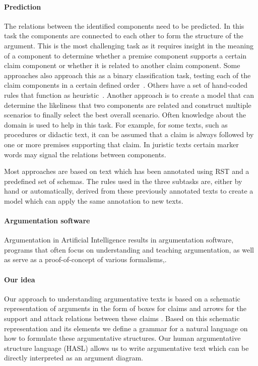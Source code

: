 \documentclass{IOS-Book-Article}
\begin{document}
\paragraph{Prediction} The relations between the identified components need to be predicted. In this task the components are connected to each other to form the structure of the argument. This is the most challenging task as it requires insight in the meaning of a component to determine whether a premise component supports a certain claim component or whether it is related to another claim component. Some approaches also approach this as a binary classification task, testing each of the claim components in a certain defined order~\cite{cohen1987}. Others have a set of hand-coded rules that function as heuristic~\cite{saintDizier2012}. Another approach is to create a model that can determine the likeliness that two components are related and construct multiple scenarios to finally select the best overall scenario. Often knowledge about the domain is used to help in this task. For example, for some texts, such as procedures or didactic text, it can be assumed that a claim is always followed by one or more premises supporting that claim. In juristic texts certain marker words may signal the relations between components.

Most approaches are based on text which has been annotated using RST and a predefined set of schemas. The rules used in the three subtasks are, either by hand or automatically, derived from these previously annotated texts to create a model which can apply the same annotation to new texts.

\paragraph{Argumentation software}
Argumentation in Artificial Intelligence results in argumentation software, programs that often focus on understanding and teaching argumentation\cite{kirschnerEtal2003,scheuerEtal2010,noroozi2012argumentation}, as well as serve as a proof-of-concept of various formalisms,\cite{verheij2007}.

\paragraph{Our idea}
Our approach to understanding argumentative texts is based on a schematic representation of arguments in the form of boxes for claims and arrows for the support and attack relations between these claims \cite{peldszus2013argument,verheij2007}. Based on this schematic representation and its elements we define a grammar for a natural language on how to formulate these argumentative structures. Our human argumentative structure language (HASL) allows us to write argumentative text which can be directly interpreted as an argument diagram.
\end{document}
